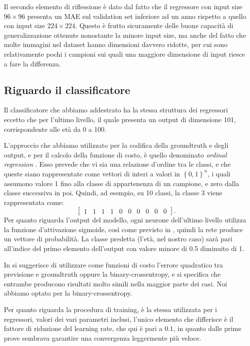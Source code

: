 Il secondo elemento di riflessione è dato dal fatto che il regressore con input size $96 \times 96$ presenta un MAE sul validation set inferiore ad un anno rispetto a quello con input size $224 \times 224$. Questo è frutto sicuramente delle buone capacità di generalizzazione ottenute nonostante la minore input size, ma anche del fatto che molte immagini nel dataset hanno dimensioni davvero ridotte, per cui sono relativamente pochi i campioni sui quali una maggiore dimensione di input riesce a fare la differenza.


\subsection{Riguardo il classificatore}

Il classificatore che abbiamo addestrato ha la stessa struttura dei regressori eccetto che per l'ultimo livello, il quale presenta un output di dimensione 101, corrispondente alle età da 0 a 100. 

L'approccio che abbiamo utilizzato per la codifica della groundtruth e degli output, e per il calcolo della funzione di costo, è quello denominato \emph{ordinal regression} \cite{ordinalregression}. Esso prevede che vi sia una relazione d'ordine tra le classi, e che queste siano rappresentate come vettori di interi a valori in $\left\{0,1\right\}^n$, i quali assumono valore 1 fino alla classe di appartenenza di un campione, e zero dalla classe successiva in poi. Quindi, ad esempio, su 10 classi, la classe 3 viene rappresentata come:
\begin{displaymath}
    \begin{bmatrix}
    1 & 1 & 1 & 1 & 0 & 0 & 0 & 0 & 0 & 0
    \end{bmatrix}.
\end{displaymath}
Per quanto riguarda l'output del modello, ogni neurone dell'ultimo livello utilizza la funzione d'attivazione sigmoide, così come previsto in \cite{ordinalregression}, quindi la rete produce un vettore di probabilità. La classe predetta (l'età, nel nostro caso) sarà pari all'indice del primo elemento dell'output con valore minore di 0.5 diminuito di 1. 

In \cite{ordinalregression} si suggerisce di utilizzare come funzioni di costo l'errore quadratico tra previsione e groundtruth oppure la binary-crossentropy, e si specifica che entrambe producono risultati molto simili nella maggior parte dei casi. Noi abbiamo optato per la binary-crossentropy. 

Per quanto riguarda la procedura di training, è la stessa utilizzata per i regressori, valori dei vari parametri inclusi, l'unico elemento che differisce è il fattore di riduzione del learning rate, che qui è pari a $0.1$, in quanto dalle prime prove sembrava garantire una convergenza leggermente più veloce.
